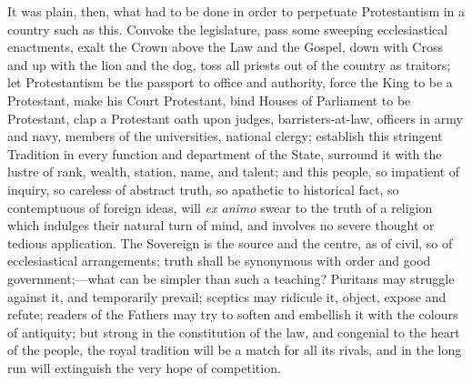It was plain, then, what had to be done in order to
perpetuate Protestantism in a country such as this.
Convoke the legislature, pass some sweeping
ecclesiastical enactments, exalt the Crown above the Law
and the Gospel, down with Cross and up with the lion and
the dog, toss all priests out of the country as traitors;
let Protestantism be the passport to office and
authority, force the King to be a Protestant, make his
Court Protestant, bind Houses of Parliament to be
Protestant, clap a Protestant oath upon judges,
barristers-at-law, officers in army and navy, members of
the universities, national clergy; establish this
stringent Tradition in every function and department of
the State, surround it with the lustre of rank, wealth,
station, name, and talent; and this people, so impatient
of inquiry, so careless of abstract truth, so apathetic
to historical fact, so contemptuous of foreign ideas,
will \emph{ex animo} swear to the truth of a religion
which indulges their natural turn of mind, and involves
no severe thought or tedious application. The Sovereign
is the source and the centre, as of civil, so of
ecclesiastical arrangements; truth shall be synonymous
with order and good government;—what can be simpler
than such a teaching? Puritans may struggle against it,
and temporarily prevail; sceptics may ridicule it,
object, expose and refute; readers of the Fathers may try
to soften and embellish it with the colours of antiquity;
but strong in the constitution of the law, and congenial
to the heart of the people, the royal tradition will be a
match for all its rivals, and in the long run will
extinguish the very hope of competition.

